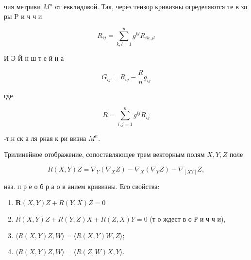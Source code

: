 \documentclass[10pt]{article}
\begin{document}
чия метрики $M^{n}$ от евклидовой. Так, через тензор кривизны огределяются те в зо ры $\mathrm{P}$ и ч ч и



\[

R_{i j}=\sum_{k, l=1}^{n} g^{k l} R_{i k, j l}

\]



И Э Й н ш т е й н а



\[

G_{i j}=R_{i j}-\frac{R}{n} g_{i j}

\]



где



\[

R=\sum_{i, j=1}^{n} g^{i j} R_{i j}

\]



-т.н ск а ля рная к ри визна $M^{n}$.



Трилинейное отображение, сопоставляющее трем векторным полям $X, Y, Z$ поле



\[

R(X, Y) Z=\nabla_{Y}\left(\nabla_{X} Z\right)-\nabla_{X}\left(\nabla_{Y} Z\right)-\nabla_{[X Y]} Z,

\]



наз. п р е о б р а о в анием кривизны. Его свойства:



\begin{enumerate}

  \item $\boldsymbol{R}(X, Y) Z+R(Y, X) Z=0$



  \item $R(X, Y) Z+R(Y, Z) X+R(Z, X) Y=0$ (т о ждест в о Р и ч ч и),



  \item $\langle R(X, Y) Z, W\rangle=\langle R(X, Y) W, Z\rangle$;



  \item $\langle R(X, Y) Z, W\rangle=\langle R(Z, W) X, Y\rangle$.



\end{enumerate}
\end{document}

